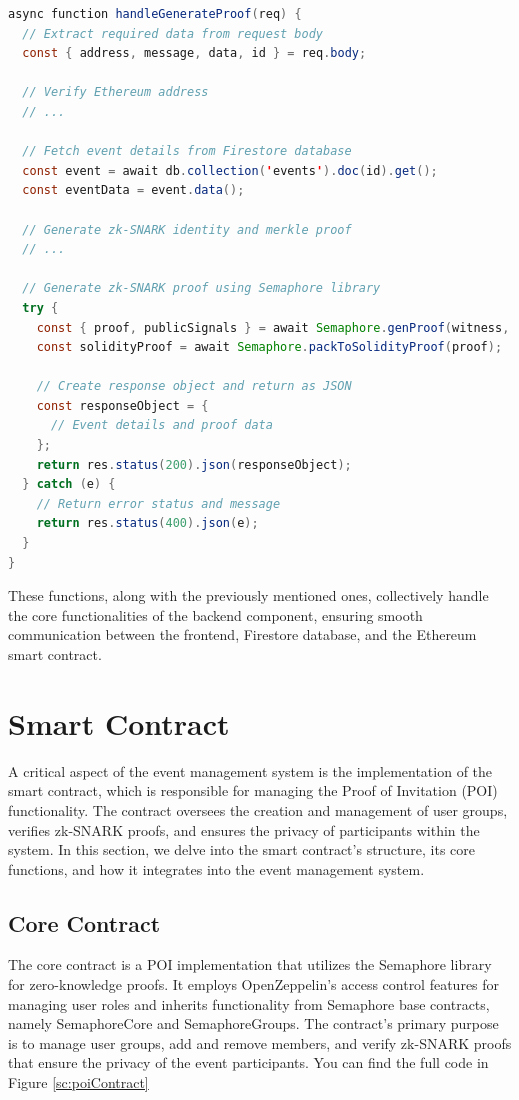\begin{lstlisting}[language=Java, name={Generate Proof Function}, label={sc:generateProof}]
async function handleGenerateProof(req) {
  // Extract required data from request body
  const { address, message, data, id } = req.body;

  // Verify Ethereum address
  // ...

  // Fetch event details from Firestore database
  const event = await db.collection('events').doc(id).get();
  const eventData = event.data();

  // Generate zk-SNARK identity and merkle proof
  // ...

  // Generate zk-SNARK proof using Semaphore library
  try {
    const { proof, publicSignals } = await Semaphore.genProof(witness, semaphoreWasmPath, semaphoreZkeyPath);
    const solidityProof = await Semaphore.packToSolidityProof(proof);

    // Create response object and return as JSON
    const responseObject = {
      // Event details and proof data
    };
    return res.status(200).json(responseObject);
  } catch (e) {
    // Return error status and message
    return res.status(400).json(e);
  }
}
\end{lstlisting}

These functions, along with the previously mentioned ones, collectively handle the core functionalities of the backend component, ensuring smooth communication between the frontend, Firestore database, and the Ethereum smart contract.



\section{Smart Contract}

A critical aspect of the event management system is the implementation of the smart contract, which is responsible for managing the Proof of Invitation (POI) functionality. The contract oversees the creation and management of user groups, verifies zk-SNARK proofs, and ensures the privacy of participants within the system. In this section, we delve into the smart contract's structure, its core functions, and how it integrates into the event management system.

\subsection{Core Contract}

The core contract is a POI implementation that utilizes the Semaphore library for zero-knowledge proofs. It employs OpenZeppelin's access control features for managing user roles and inherits functionality from Semaphore base contracts, namely SemaphoreCore and SemaphoreGroups. The contract's primary purpose is to manage user groups, add and remove members, and verify zk-SNARK proofs that ensure the privacy of the event participants. You can find the full code in Figure \ref{sc:poiContract}

